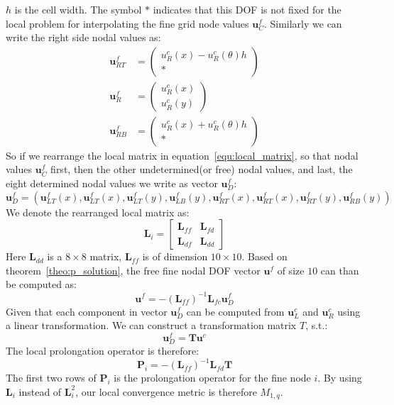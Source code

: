 $h$ is the cell width. The symbol $*$ indicates that this DOF is not fixed for the local problem for interpolating the fine grid node values $\mathbf{u}^f_{C}$. Similarly we can write the right side nodal values as:
\begin{align*}
 \mathbf{u}^f_{RT} &= \left(\begin{array}{c} u^c_R(x) - u^c_R(\theta)h \\ * \end{array}\right) \\
 \mathbf{u}^f_{R} &= \left(\begin{array}{c} u^c_R(x) \\ u^c_R(y) \end{array}\right) \\
 \mathbf{u}^f_{RB} &= \left(\begin{array}{c} u^c_R(x) + u^c_R(\theta)h \\ * \end{array}\right) 
\end{align*}
So if we rearrange the local matrix in equation~\ref{equ:local_matrix}, so that nodal values $\mathbf{u}^f_{C}$ first, then the other undetermined(or free) nodal values, and last, the eight determined nodal values we write as vector $\mathbf{u}^f_{D}$: 
$$
\mathbf{u}^f_{D} = \left(\mathbf{u}^f_{LT}(x), \mathbf{u}^f_{LT}(x), \mathbf{u}^f_{LT}(y), \mathbf{u}^f_{LB}(y),\mathbf{u}^f_{RT}(x), \mathbf{u}^f_{RT}(x), \mathbf{u}^f_{RT}(y), \mathbf{u}^f_{RB}(y)\right)
$$
We denote the rearranged local matrix as: 
 \begin{equation}
 \label{equ:matrix_split}
\mathbf{L}_i = \begin{bmatrix} 
\mathbf{L}_{ff} & \mathbf{L}_{fd} \\
\mathbf{L}_{df} & \mathbf{L}_{dd}
\end{bmatrix}
\end{equation}
 Here $\mathbf{L}_{dd}$ is a $8\times8$ matrix, $\mathbf{L}_{ff}$ is of dimension $10\times10$. Based on theorem~\ref{theo:p_solution}, the free fine nodal DOF vector $\mathbf{u}^f$ of size $10$ can than be computed as:
 \begin{equation}
 \mathbf{u}^f = -(\mathbf{L}_{ff})^{-1}\mathbf{L}_{fc}\mathbf{u}^f_D
 \end{equation} 
 Given that each component in vector $\mathbf{u}^f_{D}$ can be computed from $\mathbf{u}^c_L$ and $\mathbf{u}^c_R$ using a linear transformation. We can construct a transformation matrix $T$, s.t.:
   \begin{equation}
   \mathbf{u}^f_D = \mathbf{T} \mathbf{u}^c
   \end{equation}
   The local prolongation operator is therefore:
 \begin{equation}
 \mathbf{P}_i = -(\mathbf{L}_{ff})^{-1}\mathbf{L}_{fd}\mathbf{T}
 \label{equ:edge_P_2D}
 \end{equation}
The first two rows of  $\mathbf{P}_i$ is the prolongation operator for the fine node $i$. By using $\mathbf{L}_i$ instead of $\mathbf{L}^2_i$, our local convergence metric is therefore $M_{1,q}$. 
